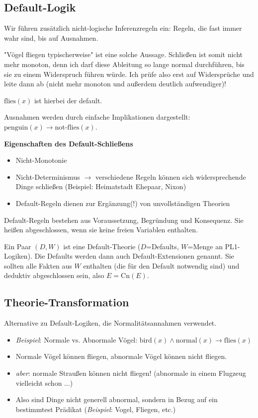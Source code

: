 \documentclass[runningheads,deutsch]{llncs}
\begin{document}
\subsection{Default-Logik}

Wir führen zusätzlich nicht-logische Inferenzregeln ein: Regeln, die fast immer wahr sind, bis auf Ausnahmen.

"Vögel fliegen typischerweise" ist eine solche Aussage. Schließen ist somit nicht mehr monoton, denn ich darf diese Ableitung so lange normal durchführen, bis sie zu einem Widerspruch führen würde. Ich prüfe also erst auf Widersprüche und leite dann ab (nicht mehr monoton und außerdem deutlich aufwendiger)!

$\text{flies}(x)$ ist hierbei der default.

Ausnahmen werden durch einfache Implikationen dargestellt: $\text{penguin}(x) \rightarrow \text{not-flies}(x)$.

\par \textbf{Eigenschaften des Default-Schließens}
\begin{itemize}
    \item Nicht-Monotonie
    \item Nicht-Determinismus $\rightarrow$ verschiedene Regeln können sich widersprechende Dinge schließen (Beispiel: Heimatstadt Ehepaar, Nixon)
    \item Default-Regeln dienen zur Ergänzung(!) von unvollständigen Theorien
\end{itemize}

Default-Regeln bestehen aus Voraussetzung, Begründung und Konsequenz. Sie heißen abgeschlossen, wenn sie keine freien Variablen enthalten.

Ein Paar $(D, W)$ ist eine Default-Theorie ($D$=Defaults, $W$=Menge an PL1-Logiken). Die Defaults werden dann auch Default-Extensionen genannt. Sie sollten alle Fakten aus $W$ enthalten (die für den Default notwendig sind) und deduktiv abgeschlossen sein, also $E = \text{Cn}(E)$.

\subsection{Theorie-Transformation}

Alternative zu Default-Logiken, die Normalitätsannahmen verwendet.

\begin{itemize}
    \item \textit{Beispiel}: Normale vs. Abnormale Vögel: $\text{bird}(x) \land \text{normal}(x) \rightarrow \text{flies}(x)$ 
    \item Normale Vögel können fliegen, abnormale Vögel können nicht fliegen.
    \item \textit{aber}: normale Straußen können nicht fliegen! (abnormale in einem Flugzeug vielleicht schon $\dots$)
    \item Also sind Dinge nicht generell abnormal, sondern in Bezug auf ein bestimmtest Prädikat (\textit{Beispiel}: Vogel, Fliegen, etc.)
\end{itemize}
\end{document}

